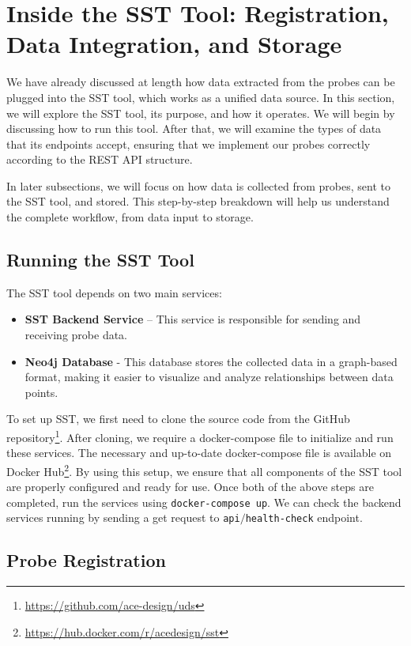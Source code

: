 \section{Inside the SST Tool: Registration, Data Integration, and Storage}\label{sec:sst_tool}

We have already discussed at length how data extracted from the probes can be plugged into the SST tool, which works as a unified data source. In this section, we will explore the SST tool, its purpose, and how it operates. We will begin by discussing how to run this tool. After that, we will examine the types of data that its endpoints accept, ensuring that we implement our probes correctly according to the REST API structure.

In later subsections, we will focus on how data is collected from probes, sent to the SST tool, and stored. This step-by-step breakdown will help us understand the complete workflow, from data input to storage.

\subsection{Running the SST Tool}

The SST tool depends on two main services:  
\begin{itemize}
    \item \textbf{SST Backend Service} – This service is responsible for sending and receiving probe data.
    \item \textbf{Neo4j Database} - This database stores the collected data in a graph-based format, making it easier to visualize and analyze relationships between data points.
\end{itemize}

To set up SST, we first need to clone the source code from the GitHub repository\footnote{\url{https://github.com/ace-design/uds}}. After cloning, we require a docker-compose file to initialize and run these services. The necessary and up-to-date docker-compose file is available on Docker Hub\footnote{\url{https://hub.docker.com/r/acedesign/sst}}. By using this setup, we ensure that all components of the SST tool are properly configured and ready for use.
\sloppy
Once both of the above steps are completed, run the services using \texttt{docker-compose up}. We can check the backend services running by sending a get request to \texttt{api${/}$health-check} endpoint.
\fussy

\subsection{Probe Registration}

